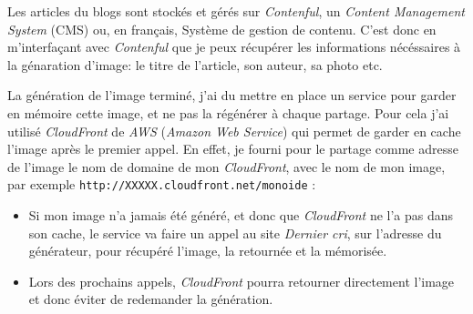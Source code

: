 \begin{Shaded}
\begin{Highlighting}[]
 \NormalTok{\textbackslash{}}
  \DataTypeTok{\textbackslash{}(}  \DataTypeTok{\textbackslash{})} \NormalTok{\textbackslash{}}
\end{Highlighting}
\end{Shaded}

\begin{Shaded}
\begin{Highlighting}[]
 
  \NormalTok{::}

    \NormalTok{::}\NormalTok{,}
    \NormalTok{,}
    \NormalTok{,}
    \NormalTok{::}
  \NormalTok{)}
\end{Highlighting}
\end{Shaded}

\bigskip

Les articles du blogs sont stockés et gérés sur \emph{Contenful}, un
\emph{Content Management System} (CMS) ou, en français, Système de
gestion de contenu. C'est donc en m'interfaçant avec \emph{Contenful}
que je peux récupérer les informations nécéssaires à la génaration
d'image: le titre de l'article, son auteur, sa photo etc.

\bigskip

La génération de l'image terminé, j'ai du mettre en place un service
pour garder en mémoire cette image, et ne pas la régénérer à chaque
partage. Pour cela j'ai utilisé \emph{CloudFront} de \emph{AWS}
(\emph{Amazon Web Service}) qui permet de garder en cache l'image après
le premier appel. En effet, je fourni pour le partage comme adresse de
l'image le nom de domaine de mon \emph{CloudFront}, avec le nom de mon
image, par exemple \texttt{http://XXXXX.cloudfront.net/monoide} :

\begin{itemize}
\item
  Si mon image n'a jamais été généré, et donc que \emph{CloudFront} ne
  l'a pas dans son cache, le service va faire un appel au site
  \emph{Dernier cri}, sur l'adresse du générateur, pour récupéré
  l'image, la retournée et la mémorisée.
\item
  Lors des prochains appels, \emph{CloudFront} pourra retourner
  directement l'image et donc éviter de redemander la génération.
\end{itemize}

